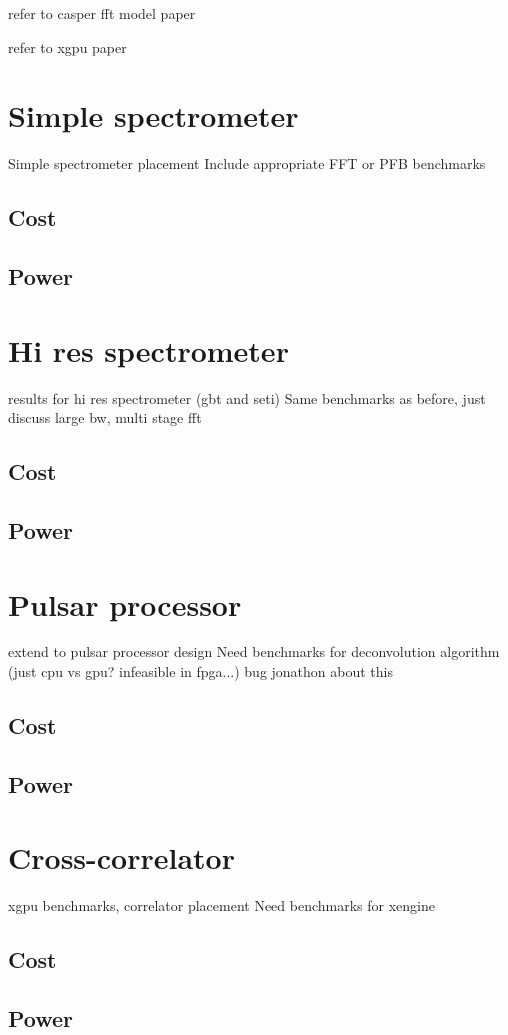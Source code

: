 refer to casper fft model paper

refer to xgpu paper

\section{Simple spectrometer}
Simple spectrometer placement
Include appropriate FFT or PFB benchmarks
\subsection{Cost}
\subsection{Power}

\section{Hi res spectrometer}
results for hi res spectrometer (gbt and seti)
Same benchmarks as before, just discuss large bw, multi stage fft
\subsection{Cost}
\subsection{Power}

\section{Pulsar processor}
extend to pulsar processor design
Need benchmarks for deconvolution algorithm (just cpu vs gpu? infeasible in fpga...) bug jonathon about this
\subsection{Cost}
\subsection{Power}

\section{Cross-correlator}
xgpu benchmarks, correlator placement
Need benchmarks for xengine
\subsection{Cost}
\subsection{Power}
